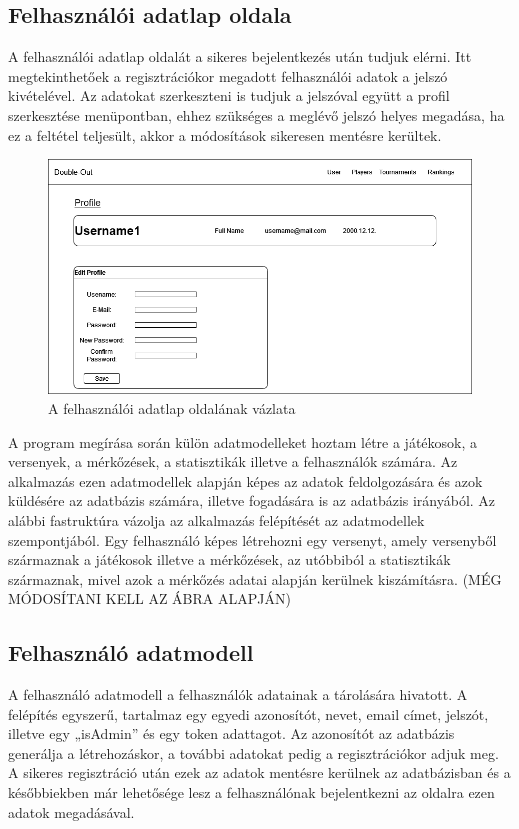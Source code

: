 \subsection{Felhasználói adatlap oldala}
A felhasználói adatlap oldalát a sikeres bejelentkezés után tudjuk elérni. Itt megtekinthetőek a regisztrációkor megadott felhasználói adatok a jelszó kivételével. Az adatokat szerkeszteni is tudjuk a jelszóval együtt a profil szerkesztése menüpontban, ehhez szükséges a meglévő jelszó helyes megadása, ha ez a feltétel teljesült, akkor a módosítások sikeresen mentésre kerültek.

\begin{figure}[h]
\centering
\includegraphics[scale=0.3]{images/ProfilePage.drawio.png}
\caption{A felhasználói adatlap oldalának vázlata}
\label{fig:cimer}
\end{figure}

A program megírása során külön adatmodelleket hoztam létre a játékosok, a versenyek, a mérkőzések, a statisztikák illetve a felhasználók számára. Az alkalmazás ezen adatmodellek alapján képes az adatok feldolgozására és azok küldésére az adatbázis számára, illetve fogadására is az adatbázis irányából. Az alábbi fastruktúra vázolja az alkalmazás felépítését az adatmodellek szempontjából. Egy felhasználó képes létrehozni egy versenyt, amely versenyből származnak a játékosok illetve a mérkőzések, az utóbbiból a statisztikák származnak, mivel azok a mérkőzés adatai alapján kerülnek kiszámításra. (MÉG MÓDOSÍTANI KELL AZ ÁBRA ALAPJÁN)

\subsection{Felhasználó adatmodell}
A felhasználó adatmodell a felhasználók adatainak a tárolására hivatott. A felépítés egyszerű, tartalmaz egy egyedi azonosítót, nevet, email címet, jelszót, illetve egy „isAdmin” és egy token adattagot. Az azonosítót az adatbázis generálja a létrehozáskor, a további adatokat pedig a regisztrációkor adjuk meg. A sikeres regisztráció után ezek az adatok mentésre kerülnek az adatbázisban és a későbbiekben már lehetősége lesz a felhasználónak bejelentkezni az oldalra ezen adatok megadásával.

